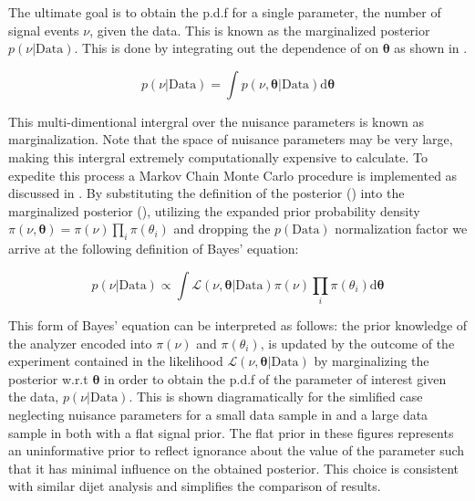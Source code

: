The ultimate goal is to obtain the p.d.f for a single parameter, the number of
signal events $\nu$, given the data.  This is known as the marginalized
posterior $p(\nu|\text{Data})$.  This is done by integrating out the dependence
of  on $\boldsymbol{\theta}$ as shown in
.

\begin{equation} \label{eq:fit:marginalization}
p(\nu|\text{Data}) = \int p(\nu,\boldsymbol{\theta}|\text{Data})\text{d}\boldsymbol{\theta}
\end{equation}

This multi-dimentional intergral over the nuisance parameters is known as
marginalization.  Note that the space of nuisance parameters may be very large,
making this intergral extremely computationally expensive to calculate.  To
expedite this process a Markov Chain Monte Carlo procedure is implemented as
discussed in . By substituting the definition of the
posterior () into the marginalized posterior
(), utilizing the expanded prior probability
density $\pi(\nu,\boldsymbol{\theta}) = \pi(\nu)\prod_{i}\pi(\theta_i)$ and
dropping the $p(\text{Data})$ normalization factor we arrive at the following
definition of Bayes' equation: 

\begin{equation} \label{eq:fit:bayes}
p(\nu|\text{Data}) \propto \int \mathcal{L}(\nu,\boldsymbol{\theta}|\text{Data})\pi(\nu)\prod_{i}\pi(\theta_i)\text{d}\boldsymbol{\theta}
\end{equation}

This form of Bayes' equation can be interpreted as follows: the prior knowledge
of the analyzer encoded into $\pi(\nu)$ and $\pi(\theta_{i})$, is updated by
the outcome of the experiment contained in the likelihood
$\mathcal{L}(\nu,\boldsymbol{\theta}|\text{Data})$ by marginalizing the
posterior w.r.t $\boldsymbol{\theta}$ in order to obtain the p.d.f of the
parameter of interest given the data, $p(\nu|\text{Data})$.  This is shown
diagramatically for the simlified case neglecting nuisance parameters for a
small data sample in  and a large data sample in
 both with a flat signal prior.  The flat prior in
these figures represents an uninformative prior to reflect ignorance about
the value of the parameter such that it has minimal influence on the obtained
posterior.  This choice is consistent with similar dijet analysis
\cite{Beresford:2642397} and simplifies the comparison of results.

